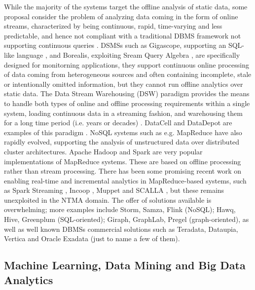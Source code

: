 \documentclass[10pt, conference, letterpaper]{IEEEtran}
\begin{document}
While the majority of the systems target the offline analysis of static data, some proposal consider the problem of analyzing data coming in the form of online streams, characterized by being continuous, rapid, time-varying and less predictable, and hence not compliant with a traditional DBMS framework not supporting continuous queries \cite{babcock2002}.  DSMSs such as Gigascope, supporting an SQL-like language \cite{cranor2003}, and Borealis, exploiting Sream Query Algebra \cite{abadi2003}, are specifically designed for monitorning applications, they support continuous online processing of data coming from heterogeneous sources and often containing incomplete, stale or intentionally omitted information, but they cannot run offline analytics over static data. The Data Stream Warehousing (DSW) paradigm provides the means to handle both types of online and offline processing requirements within a single system, loading continuous data in a streaming fashion, and warehousing them for a long time period (i.e. years or decades) \cite{golab2011}. DataCell and DataDepot are examples of this paradigm \cite{golab2009}. NoSQL systems such as e.g. MapReduce \cite{dean2008} have also rapidly evolved, supporting the analysis of unstructured data over distributed cluster architectures. Apache Hadoop \cite{white2009} and Spark \cite{zaharia2010} are very popular implementations of MapReduce systems. These are based on offline processing rather than stream processing. There has been some promising recent work on enabling real-time and incremental analytics in MapReduce-based systems, such as Spark Streaming \cite{zaharia2012}, Incoop \cite{indoop}, Muppet \cite{muppet} and SCALLA \cite{scalla}, but these remains unexploited in the NTMA domain. The offer of solutions available is overwhelming; more examples include Storm, Samza, Flink (NoSQL); Hawq, Hive, Greenplum (SQL-oriented); Giraph, GraphLab, Pregel (graph-oriented), as well as well known DBMSs commercial solutions such as Teradata, Dataupia, Vertica and Oracle Exadata (just to name a few of them). 
 

\subsection{Machine Learning, Data Mining and Big Data Analytics}
\end{document}
